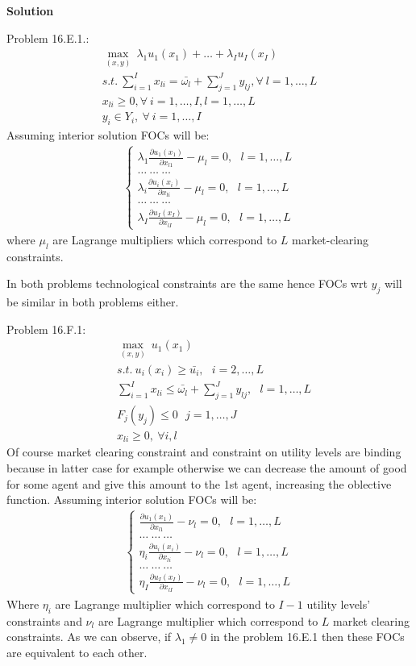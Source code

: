 \documentclass[a4paper]{article}
\begin{document}
\textbf{Solution}

Problem 16.E.1.:
\begin{align*}
\underset{(x, y)}{\max}\ \lambda_1u_1(x_1) + \dots + \lambda_Iu_I(x_I)\\
s.t.\ \sum_{i=1}^I x_{li} = \bar{\omega_l} + \sum_{j=1}^Jy_{lj}, \forall\ l = 1, \dots, L\\
x_{li} \ge 0, \forall\ i = 1, \dots, I, l = 1, \dots, L\\
y_{i} \in Y_i,\ \forall\ i = 1, \dots, I
\end{align*}
Assuming interior solution FOCs will be:
\begin{align*}
\begin{cases}
\lambda_1\frac{\partial u_1(x_1)}{\partial x_{l1}} - \mu_l = 0,\ \ \  l = 1, \dots, L\\
\dots\ \dots\ \dots\\
\lambda_i \frac{\partial u_i(x_i)}{\partial x_{li}} - \mu_l = 0,\ \ \  l = 1, \dots, L\\
\dots\ \dots\ \dots\\
\lambda_I\frac{\partial u_I(x_I)}{\partial x_{lI}} - \mu_l = 0,\ \ \  l = 1, \dots, L
\end{cases}
\end{align*}
where $\mu_l$ are Lagrange multipliers which correspond to $L$ market-clearing constraints. 

In both problems technological constraints are the same hence FOCs wrt $y_j$ will be similar in both problems either.

Problem 16.F.1:
\begin{align*}
&\underset{(x, y)}{\max}\ u_1(x_1)\\
&s.t.\ u_i(x_i) \ge \bar{u_i},\ \ \ i=2, \dots, L\\
&\sum_{i=1}^Ix_{li} \le \bar{\omega_l} + \sum_{j=1}^Jy_{lj},\ \ \ l = 1, \dots, L\\
&F_j(y_j) \le 0\ \ \ j = 1, \dots, J\\
&x_{li} \ge 0, \ \forall i, l
\end{align*}
Of course market clearing constraint and constraint on utility levels are binding because in latter case for example otherwise we can decrease the amount of good for some agent and give this amount to the 1st agent, increasing the oblective function.
Assuming interior solution FOCs will be:
\begin{align*}
\begin{cases}
\frac{\partial u_1(x_1)}{\partial x_{l1}} - \nu_l = 0, \ \ \ l = 1, \dots, L\\
\dots\ \dots\ \dots\\
\eta_i\frac{\partial u_i(x_i)}{\partial x_{li}} - \nu_l = 0,\ \ \ l = 1, \dots, L\\
\dots\ \dots\ \dots\\
\eta_I\frac{\partial u_I(x_I)}{\partial x_{lI}} - \nu_l = 0, \ \ \ l = 1, \dots, L
\end{cases}
\end{align*}
Where $\eta_i$ are Lagrange multiplier which correspond to $I-1$ utility levels' constraints and $\nu_l$ are Lagrange multiplier which correspond to $L$ market clearing constraints. As we can observe, if $\lambda_1 \neq 0$ in the problem 16.E.1 then these FOCs are equivalent to each other.
\end{document}

